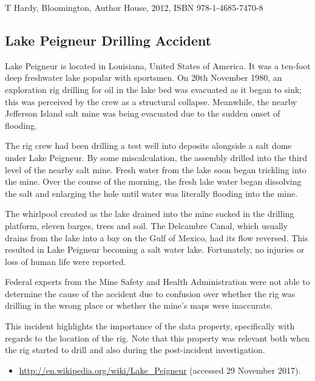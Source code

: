 T Hardy,  Bloomington, Author House, 2012, ISBN 978-1-4685-7470-8

\subsection{Lake Peigneur Drilling Accident} \label{bkm:incacc:peigneur}
Lake Peigneur is located in Louisiana, United States of America. It was a ten-foot deep freshwater lake popular with sportsmen. On 20th November 1980, an exploration rig drilling for oil in the lake bed was evacuated as it began to sink; this was perceived by the crew as a structural collapse. Meanwhile, the nearby Jefferson Island salt mine was being evacuated due to the sudden onset of flooding. 

The rig crew had been drilling a test well into deposits alongside a salt dome under Lake Peigneur. By some miscalculation, the assembly drilled into the third level of the nearby salt mine. Fresh water from the lake soon began trickling into the mine. Over the course of the morning, the fresh lake water began dissolving the salt and enlarging the hole until water was literally flooding into the mine.

The whirlpool created as the lake drained into the mine sucked in the drilling platform, eleven barges, trees and soil. The Delcambre Canal, which usually drains from the lake into a bay on the Gulf of Mexico, had its flow reversed. This resulted in Lake Peigneur becoming a salt water lake. Fortunately, no injuries or loss of human life were reported. 

Federal experts from the Mine Safety and Health Administration were not able to determine the cause of the accident due to confusion over whether the rig was drilling in the wrong place or whether the mine's maps were inaccurate.

This incident highlights the importance of the  \gls{data property}, specifically with regards to the location of the rig. Note that this property was relevant both when the rig started to drill and also during the post-incident investigation.

\begin{samepage}
\begin{itemize}
  \item \raggedright{\href{http://en.wikipedia.org/wiki/Lake_Peigneur}{http://en.wikipedia.org/wiki/Lake\_Peigneur} (accessed 29 November 2017).}
\end{itemize}
\end{samepage}


